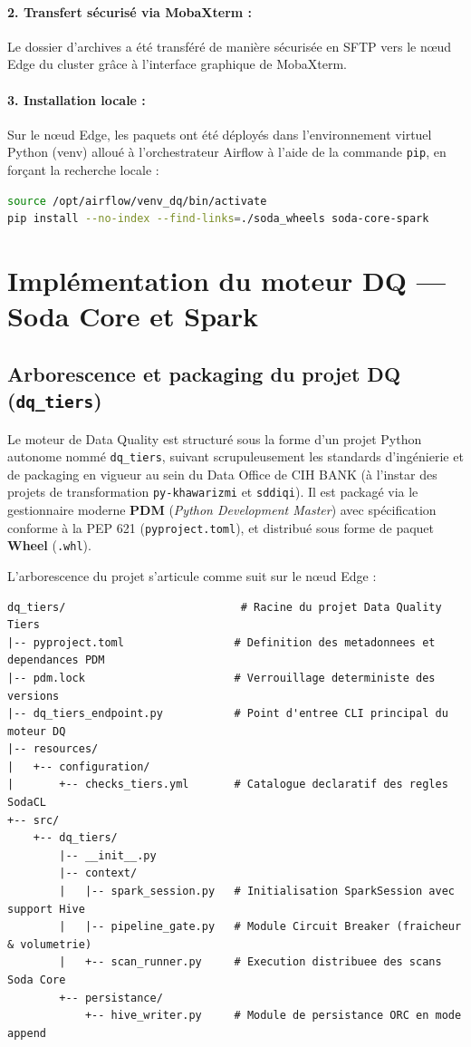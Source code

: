 \paragraph{2. Transfert sécurisé via MobaXterm :} Le dossier d'archives a été transféré de manière sécurisée en SFTP vers le nœud Edge du cluster grâce à l'interface graphique de MobaXterm.

\paragraph{3. Installation locale :} Sur le nœud Edge, les paquets ont été déployés dans l'environnement virtuel Python (venv) alloué à l'orchestrateur Airflow à l'aide de la commande \texttt{pip}, en forçant la recherche locale :

\begin{lstlisting}[language=bash]
source /opt/airflow/venv_dq/bin/activate
pip install --no-index --find-links=./soda_wheels soda-core-spark
\end{lstlisting}

\section{Implémentation du moteur DQ — Soda Core et Spark}

\subsection{Arborescence et packaging du projet DQ (\texttt{dq\_tiers})}

Le moteur de Data Quality est structuré sous la forme d'un projet Python autonome nommé \texttt{dq\_tiers}, suivant scrupuleusement les standards d'ingénierie et de packaging en vigueur au sein du Data Office de CIH BANK (à l'instar des projets de transformation \texttt{py-khawarizmi} et \texttt{sddiqi}). Il est packagé via le gestionnaire moderne \textbf{PDM} (\textit{Python Development Master}) avec spécification conforme à la PEP 621 (\texttt{pyproject.toml}), et distribué sous forme de paquet \textbf{Wheel} (\texttt{.whl}).

L'arborescence du projet s'articule comme suit sur le nœud Edge :

\begin{lstlisting}
dq_tiers/                           # Racine du projet Data Quality Tiers
|-- pyproject.toml                 # Definition des metadonnees et dependances PDM
|-- pdm.lock                       # Verrouillage deterministe des versions
|-- dq_tiers_endpoint.py           # Point d'entree CLI principal du moteur DQ
|-- resources/
|   +-- configuration/
|       +-- checks_tiers.yml       # Catalogue declaratif des regles SodaCL
+-- src/
    +-- dq_tiers/
        |-- __init__.py
        |-- context/
        |   |-- spark_session.py   # Initialisation SparkSession avec support Hive
        |   |-- pipeline_gate.py   # Module Circuit Breaker (fraicheur & volumetrie)
        |   +-- scan_runner.py     # Execution distribuee des scans Soda Core
        +-- persistance/
            +-- hive_writer.py     # Module de persistance ORC en mode append
\end{lstlisting}

